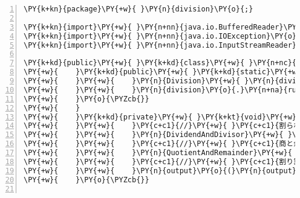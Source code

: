 \begin{Verbatim}[commandchars=\\\{\},numbers=left,firstnumber=1,stepnumber=1,frame=single,fontsize=\small]
\PY{k+kn}{package}\PY{+w}{ }\PY{n}{division}\PY{o}{;}

\PY{k+kn}{import}\PY{+w}{ }\PY{n+nn}{java.io.BufferedReader}\PY{o}{;}
\PY{k+kn}{import}\PY{+w}{ }\PY{n+nn}{java.io.IOException}\PY{o}{;}
\PY{k+kn}{import}\PY{+w}{ }\PY{n+nn}{java.io.InputStreamReader}\PY{o}{;}

\PY{k+kd}{public}\PY{+w}{ }\PY{k+kd}{class}\PY{+w}{ }\PY{n+nc}{Division}\PY{+w}{ }\PY{o}{\PYZob{}}
\PY{+w}{    }\PY{k+kd}{public}\PY{+w}{ }\PY{k+kd}{static}\PY{+w}{ }\PY{k+kt}{void}\PY{+w}{ }\PY{n+nf}{main}\PY{o}{(}\PY{n}{String}\PY{o}{[}\PY{o}{]}\PY{+w}{ }\PY{n}{args}\PY{o}{)}\PY{+w}{ }\PY{k+kd}{throws}\PY{+w}{ }\PY{n}{Exception}\PY{+w}{ }\PY{o}{\PYZob{}}
\PY{+w}{    }\PY{+w}{    }\PY{n}{Division}\PY{+w}{ }\PY{n}{division}\PY{+w}{ }\PY{o}{=}\PY{+w}{ }\PY{k}{new}\PY{+w}{ }\PY{n}{Division}\PY{o}{(}\PY{o}{)}\PY{o}{;}
\PY{+w}{    }\PY{+w}{    }\PY{n}{division}\PY{o}{.}\PY{n+na}{run}\PY{o}{(}\PY{o}{)}\PY{o}{;}
\PY{+w}{    }\PY{o}{\PYZcb{}}
\PY{+w}{    }
\PY{+w}{    }\PY{k+kd}{private}\PY{+w}{ }\PY{k+kt}{void}\PY{+w}{ }\PY{n+nf}{run}\PY{o}{(}\PY{o}{)}\PY{+w}{ }\PY{k+kd}{throws}\PY{+w}{ }\PY{n}{Exception}\PY{+w}{ }\PY{o}{\PYZob{}}
\PY{+w}{    }\PY{+w}{    }\PY{c+c1}{//}\PY{+w}{ }\PY{c+c1}{割られる数と割る数を読み込む}
\PY{+w}{    }\PY{+w}{    }\PY{n}{DividendAndDivisor}\PY{+w}{ }\PY{n}{input}\PY{+w}{ }\PY{o}{=}\PY{+w}{ }\PY{n}{input}\PY{o}{(}\PY{o}{)}\PY{o}{;}
\PY{+w}{    }\PY{+w}{    }\PY{c+c1}{//}\PY{+w}{ }\PY{c+c1}{商と余を計算する}
\PY{+w}{    }\PY{+w}{    }\PY{n}{QuotientAndRemainder}\PY{+w}{ }\PY{n}{output}\PY{+w}{ }\PY{o}{=}\PY{+w}{ }\PY{n}{process}\PY{o}{(}\PY{n}{input}\PY{o}{)}\PY{o}{;}
\PY{+w}{    }\PY{+w}{    }\PY{c+c1}{//}\PY{+w}{ }\PY{c+c1}{割り算の結果を表示する}
\PY{+w}{    }\PY{+w}{    }\PY{n}{output}\PY{o}{(}\PY{n}{output}\PY{o}{)}\PY{o}{;}
\PY{+w}{    }\PY{o}{\PYZcb{}}


\end{Verbatim}
